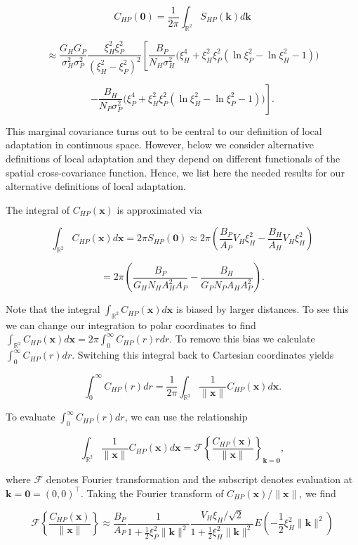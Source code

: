 \documentclass{article}
\begin{document}
\[C_{HP}(\pmb 0)=\frac{1}{2\pi}\int_{\mathbb R^2}S_{HP}(\pmb k)d\pmb k\]

\[\approx \frac{G_HG_P}{\sigma_H^2\sigma_P^2}\frac{\xi_H^2\xi_P^2}{(\xi_H^2-\xi_P^2)^2}\left[\frac{B_P}{N_H\sigma_H^2}\Big(\xi_H^4+\xi_H^2\xi_P^2(\ln\xi_P^2-\ln\xi_H^2-1)\Big)\right.\]

\[\left.-\frac{B_H}{N_P\sigma_P^2}\Big(\xi_P^4+\xi_H^2\xi_P^2(\ln\xi_H^2-\ln\xi_P^2-1)\Big)\right].\]

This marginal covariance turns out to be central to our definition of
local adaptation in continuous space. However, below we consider
alternative definitions of local adaptation and they depend on different
functionals of the spatial cross-covariance function. Hence, we list
here the needed results for our alternative definitions of local
adaptation.

The integral of \(C_{HP}(\pmb x)\) is approximated via

\[\int_{\mathbb R^2}C_{HP}(\pmb x)d\pmb x=2\pi S_{HP}(\pmb 0)\approx2\pi\left(\frac{B_P}{A_P}V_H\xi_H^2-\frac{B_H}{A_H}V_H\xi_H^2\right)\]

\[=2\pi \left(\frac{B_P}{G_HN_HA_H^2A_P}-\frac{B_H}{G_PN_PA_HA_P^2}\right).\]

Note that the integral \(\int_{\mathbb R^2}C_{HP}(\pmb x)d\pmb x\) is
biased by larger distances. To see this we can change our integration to
polar coordinates to find
\(\int_{\mathbb R^2}C_{HP}(\pmb x)d\pmb x=2\pi\int_0^\infty C_{HP}(r)rdr\).
To remove this bias we calculate \(\int_0^\infty C_{HP}(r)dr\).
Switching this integral back to Cartesian coordinates yields

\[\int_0^\infty C_{HP}(r)dr=\frac{1}{2\pi}\int_{\mathbb R^2}\frac{1}{\|\pmb x\|}C_{HP}(\pmb x)d\pmb x.\]

To evaluate \(\int_0^\infty C_{HP}(r)dr\), we can use the relationship

\[\int_{\mathbb R^2}\frac{1}{\|\pmb x\|}C_{HP}(\pmb x)d\pmb x=\mathcal F\left\{\frac{C_{HP}(\pmb x)}{\|\pmb x\|}\right\}_{\pmb k=\pmb 0},\]

where \(\mathcal F\) denotes Fourier transformation and the subscript
denotes evaluation at \(\pmb k=\pmb 0=(0,0)^\top\). Taking the Fourier
transform of \(C_{HP}(\pmb x)/\|\pmb x\|\), we find

\[\mathcal F\left\{\frac{C_{HP}(\pmb x)}{\|\pmb x\|}\right\}\approx\frac{B_P}{A_P}\frac{1}{1+\frac{1}{2}\xi_P^2\|\pmb k\|^2} \frac{V_H\xi_H/\sqrt2}{1+\frac{1}{2}\xi_H^2\|\pmb k\|^2}E\left(-\frac{1}{2}\xi_H^2\|\pmb k\|^2\right)\]
\end{document}
